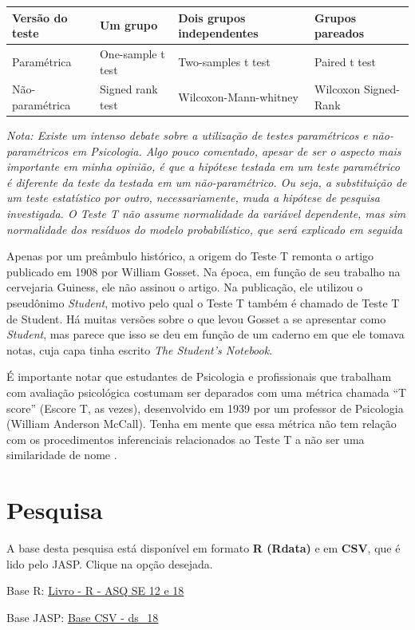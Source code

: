 \documentclass[
]{book}
\begin{document}
\begin{longtable}[]{@{}llll@{}}
\toprule
Versão do teste & Um grupo & Dois grupos independentes & Grupos pareados\tabularnewline
\midrule
\endhead
Paramétrica & One-sample t test & Two-samples t test & Paired t test\tabularnewline
Não-paramétrica & Signed rank test & Wilcoxon-Mann-whitney & Wilcoxon Signed-Rank\tabularnewline
\bottomrule
\end{longtable}

\emph{Nota: Existe um intenso debate sobre a utilização de testes paramétricos e não-paramétricos em Psicologia. Algo pouco comentado, apesar de ser o aspecto mais importante em minha opinião, é que a hipótese testada em um teste paramétrico é diferente da teste da testada em um não-paramétrico. Ou seja, a substituição de um teste estatístico por outro, necessariamente, muda a hipótese de pesquisa investigada. O Teste T não assume normalidade da variável dependente, mas sim normalidade dos resíduos do modelo probabilístico, que será explicado em seguida}

Apenas por um preâmbulo histórico, a origem do Teste T remonta o artigo publicado em 1908 por William Gosset. Na época, em função de seu trabalho na cervejaria Guiness, ele não assinou o artigo. Na publicação, ele utilizou o pseudônimo \emph{Student}, motivo pelo qual o Teste T também é chamado de Teste T de Student. Há muitas versões sobre o que levou Gosset a se apresentar como \emph{Student}, mas parece que isso se deu em função de um caderno em que ele tomava notas, cuja capa tinha escrito \emph{The Student's Notebook}.

É importante notar que estudantes de Psicologia e profissionais que trabalham com avaliação psicológica costumam ser deparados com uma métrica chamada ``T score'' (Escore T, as vezes), desenvolvido em 1939 por um professor de Psicologia (William Anderson McCall). Tenha em mente que essa métrica não tem relação com os procedimentos inferenciais relacionados ao Teste T a não ser uma similaridade de nome \citep{Krus1977}.

\hypertarget{pesquisa-2}{%
\section{Pesquisa}\label{pesquisa-2}}

\begin{base}

A base desta pesquisa está disponível em formato \textbf{R (Rdata)} e em \textbf{CSV}, que é lido pelo JASP. Clique na opção desejada.

Base R: \href{https://github.com/anovabr/mqt/raw/master/bases/Livro\%20-\%20R\%20-\%20ASQ\%20SE\%2012\%20e\%2018.RData}{Livro - R - ASQ SE 12 e 18}

Base JASP: \href{https://github.com/anovabr/mqt/raw/master/bases/bases_csv_jasp.zip}{Base CSV - ds\_18}

\end{base}
\end{document}
